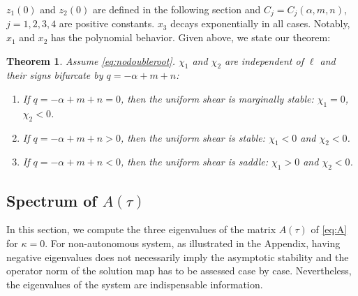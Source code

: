 \documentclass[a4paper,11pt]{article}
\def\l{(2\pi \ell)}
\newtheorem{theorem}{Theorem}
\theoremstyle{remark}
\begin{document}
$z_1(0)$ and $z_2(0)$ are defined in the following section and $C_j=C_j(\alpha,m,n)$, $j=1,2,3,4$ are positive constants. %
$x_3$ decays exponentially in all cases. Notably, $x_1$ and $x_2$ has the polynomial behavior. Given above, we state our theorem: %
\begin{theorem} \label{thm:1} Assume \eqref{eq:nodoubleroot}. $\chi_1$ and $\chi_2$ are independent of $\ell$ and their signs bifurcate by $q=-\alpha+m+n$:
 \begin{enumerate}
  \item If $q=-\alpha+m+n=0$, then the uniform shear is marginally stable: $\chi_1=0$, $\chi_2<0$.
  \item If $q=-\alpha+m+n>0$, then the uniform shear is stable: $\chi_1<0$ and $\chi_2<0$.
  \item If $q=-\alpha+m+n<0$, then the uniform shear is saddle: $\chi_1>0$ and $\chi_2<0$.
 \end{enumerate}
\end{theorem}













\subsection{Spectrum of $A(\tau)$}
In this section, we compute the three eigenvalues of the matrix $A(\tau)$ of \eqref{eq:A} for $\kappa=0$. For non-autonomous system, as illustrated in the Appendix, having negative eigenvalues does not necessarily imply the asymptotic stability and the operator norm of the solution map has to be assessed case by case. Nevertheless, the eigenvalues of the system are indispensable information.
\end{document}
